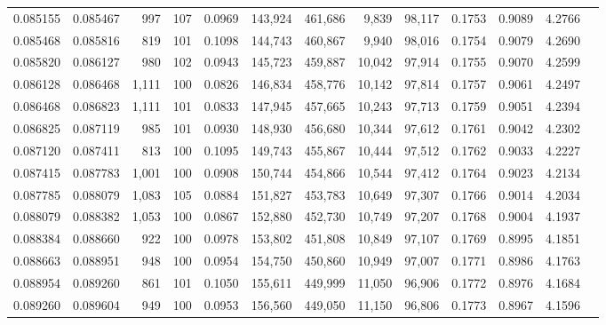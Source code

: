 \begin{tabular}{rrrrrrrrrrrrr}
0.085155 & 0.085467 &   997 & 107 &                                     0.0969 & 143,924 & 461,686 &   9,839 &  98,117 & 0.1753 & 0.9089 & 4.2766 \\
0.085468 & 0.085816 &   819 & 101 &                                     0.1098 & 144,743 & 460,867 &   9,940 &  98,016 & 0.1754 & 0.9079 & 4.2690 \\
0.085820 & 0.086127 &   980 & 102 &                                     0.0943 & 145,723 & 459,887 &  10,042 &  97,914 & 0.1755 & 0.9070 & 4.2599 \\
0.086128 & 0.086468 & 1,111 & 100 &                                     0.0826 & 146,834 & 458,776 &  10,142 &  97,814 & 0.1757 & 0.9061 & 4.2497 \\
0.086468 & 0.086823 & 1,111 & 101 &                                     0.0833 & 147,945 & 457,665 &  10,243 &  97,713 & 0.1759 & 0.9051 & 4.2394 \\
0.086825 & 0.087119 &   985 & 101 &                                     0.0930 & 148,930 & 456,680 &  10,344 &  97,612 & 0.1761 & 0.9042 & 4.2302 \\
0.087120 & 0.087411 &   813 & 100 &                                     0.1095 & 149,743 & 455,867 &  10,444 &  97,512 & 0.1762 & 0.9033 & 4.2227 \\
0.087415 & 0.087783 & 1,001 & 100 &                                     0.0908 & 150,744 & 454,866 &  10,544 &  97,412 & 0.1764 & 0.9023 & 4.2134 \\
0.087785 & 0.088079 & 1,083 & 105 &                                     0.0884 & 151,827 & 453,783 &  10,649 &  97,307 & 0.1766 & 0.9014 & 4.2034 \\
0.088079 & 0.088382 & 1,053 & 100 &                                     0.0867 & 152,880 & 452,730 &  10,749 &  97,207 & 0.1768 & 0.9004 & 4.1937 \\
0.088384 & 0.088660 &   922 & 100 &                                     0.0978 & 153,802 & 451,808 &  10,849 &  97,107 & 0.1769 & 0.8995 & 4.1851 \\
0.088663 & 0.088951 &   948 & 100 &                                     0.0954 & 154,750 & 450,860 &  10,949 &  97,007 & 0.1771 & 0.8986 & 4.1763 \\
0.088954 & 0.089260 &   861 & 101 &                                     0.1050 & 155,611 & 449,999 &  11,050 &  96,906 & 0.1772 & 0.8976 & 4.1684 \\
0.089260 & 0.089604 &   949 & 100 &                                     0.0953 & 156,560 & 449,050 &  11,150 &  96,806 & 0.1773 & 0.8967 & 4.1596 \\

\end{tabular}
